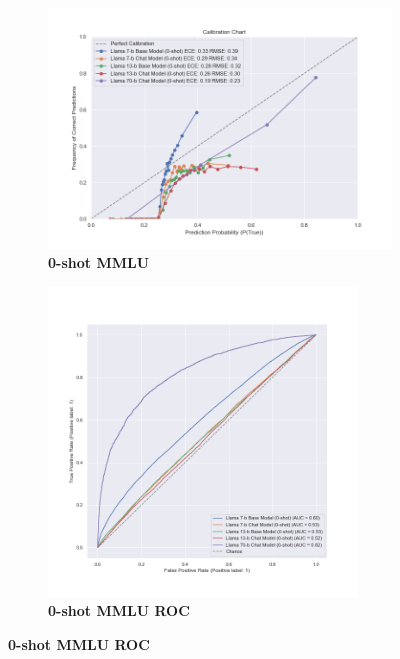 \documentclass[11pt]{article}
\begin{document}
\begin{figure}
     \centering
     \begin{subfigure}[b]{0.60\textwidth}
         \centering 
         \includegraphics[width=1.1\textwidth]{figures/0-shot-MMLU.png}
         \caption{\textbf{0-shot MMLU} }
         \label{fig:0-shot-MMLU}
     \end{subfigure}
     \hfill
         \begin{subfigure}[b]{0.38\textwidth}
         \centering 
         \includegraphics[width=0.9\textwidth]{figures/0-shot-MMLU-roc.png}
         \caption{\textbf{0-shot MMLU ROC}}
         \label{fig:0-shot-MMLU-roc}

\end{subfigure}
\end{figure}
\end{document}
